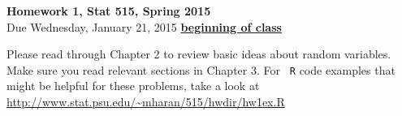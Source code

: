\documentclass{article}
\begin{document}
\begin{center}
\large
{\bf Homework 1, Stat 515, Spring 2015}\\
\normalsize
Due Wednesday, January 21, 2015 \underline{{\bf beginning of class}}\\
\end{center}

\noindent Please read through Chapter 2 to review basic ideas about random
variables. Make sure you read relevant sections in Chapter 3. For {\tt
  R} code examples that might be helpful for these problems, take a
look at \url{http://www.stat.psu.edu/~mharan/515/hwdir/hw1ex.R}  

\end{document}
